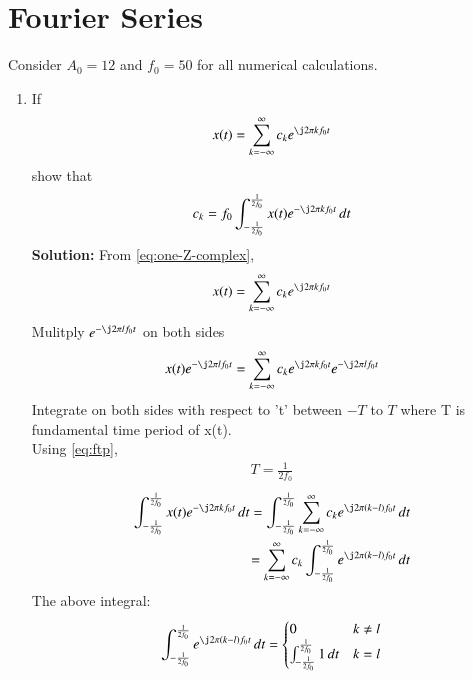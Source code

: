 \documentclass[journal,12pt,twocolumn]{IEEEtran}
\newcommand{\solution}{\noindent \textbf{Solution: }}
\providecommand{\brak}[1]{\ensuremath{\left(#1\right)}}
\numberwithin{equation}{section}
\renewcommand\thesection{\arabic{section}}
\begin{document}
    \section{Fourier Series}
    Consider $A_0 =12$ and $f_0 = 50$ for all numerical calculations.
    \begin{enumerate}[label=\thesection.\arabic*,ref=\thesection.\theenumi]
    \item If
    \begin{align}
        x(t) = \sum_{k = -\infty}^{\infty}c_ke^{\j2\pi kf_0 t}
    \label{eq:one-Z-complex}
    \end{align}
    show that 
    \begin{align}
        c_k = f_0\int_{-\frac{1}{2f_0}}^{\frac{1}{2f_0}}x(t)e^{-\j2\pi kf_0 t}\, dt
    \label{eq:one-Z}
    \end{align}
    \solution 
    From \eqref{eq:one-Z-complex},
    \begin{align}
            x(t) = \sum_{k = -\infty}^{\infty}c_ke^{\j2\pi kf_0 t}
    \end{align}
    Mulitply $e^{-\j2\pi lf_0 t}$ on both sides
    \begin{align}
    x(t)e^{-\j2\pi lf_0 t}=\sum_{k = -\infty}^{\infty}c_ke^{\j2\pi kf_0 t}e^{-\j2\pi lf_0 t}
    \end{align}
    Integrate on both sides with respect to 't' between $-T$ to $T$ where T is fundamental time period of x(t).\\
    Using \eqref{eq:ftp},
    \begin{align}
    T=\frac{1}{2f_0}
    \end{align}
    \begin{align}
    \int_{-\frac{1}{2f_0}}^{\frac{1}{2f_0}}x(t)e^{-\j2\pi kf_0 t}\, dt=\int_{-\frac{1}{2f_0}}^{\frac{1}{2f_0}}\sum_{k = -\infty}^{\infty}c_ke^{\j2\pi \brak{k-l}f_0 t}\,dt\\
    =\sum_{k = -\infty}^{\infty}c_k\int_{-\frac{1}{2f_0}}^{\frac{1}{2f_0}}e^{\j2\pi \brak{k-l}f_0 t}\,dt
    \end{align}
    The above integral:
    \begin{align}
    \int_{-\frac{1}{2f_0}}^{\frac{1}{2f_0}}e^{\j2\pi \brak{k-l}f_0 t}\,dt=
          \begin{cases}
0 & k\neq l
\\
 \int_{-\frac{1}{2f_0}}^{\frac{1}{2f_0}}1\,dt& k=l
\end{cases}
    \end{align}
    \begin{align}

\end{align}
\end{enumerate}
\end{document}

